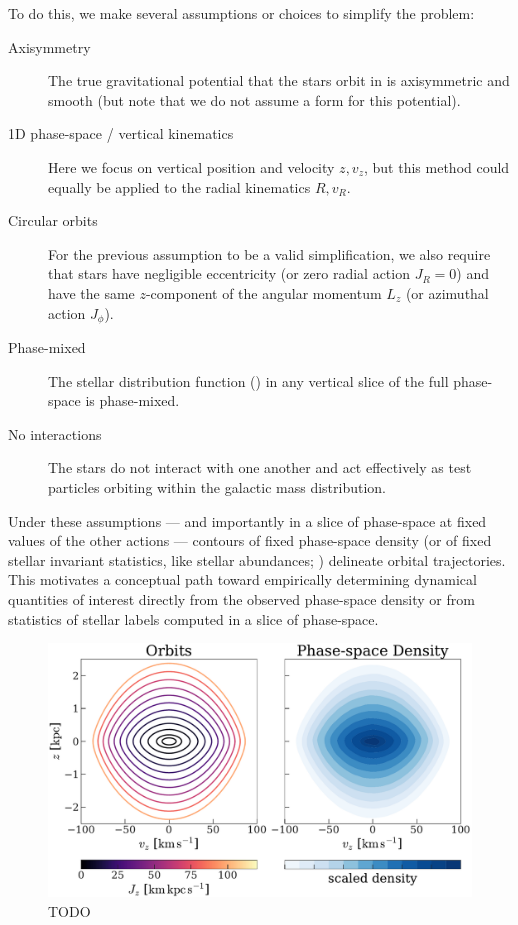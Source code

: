 To do this, we make several assumptions or choices to simplify the problem:
\begin{description}
    \item[Axisymmetry] The true gravitational potential that the stars orbit in is
    axisymmetric and smooth (but note that we do not assume a form for this potential).
    \item[1D phase-space / vertical kinematics] Here we focus on vertical position and
    velocity $z, v_z$, but this method could equally be applied to the radial kinematics
    $R, v_R$.
    \item[Circular orbits] For the previous assumption to be a valid simplification, we
    also require that stars have negligible eccentricity (or zero radial action $J_R=0$)
    and have the same $z$-component of the angular momentum $L_z$ (or azimuthal action
    $J_\phi$).
    \item[Phase-mixed] The stellar distribution function (\df) in any vertical slice of
    the full phase-space is phase-mixed.
    \item[No interactions] The stars do not interact with one another and act
    effectively as test particles orbiting within the galactic mass distribution.
\end{description}
Under these assumptions --- and importantly in a slice of phase-space at fixed values of
the other actions --- contours of fixed phase-space density (or of fixed stellar
invariant statistics, like stellar abundances; \citealt{Price-Whelan:2021}) delineate
orbital trajectories.
This motivates a conceptual path toward empirically determining dynamical quantities of
interest directly from the observed phase-space density or from statistics of stellar
labels computed in a slice of phase-space.

\begin{figure}[t!]
\begin{center}
\includegraphics[width=\textwidth]{illustrate-zvz.pdf}
\end{center}
\caption{%
TODO
\label{fig:zvz}
}
\end{figure}

